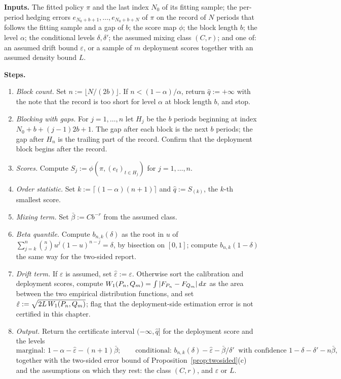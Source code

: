 \documentclass[../../../main.tex]{subfiles}
\begin{document}
\begin{algorithmenv}\label{alg:cert}
\textbf{Inputs.} The fitted policy $\pi$ and the last index $N_0$ of its fitting sample; the per-period hedging errors $e_{N_0+b+1},\dots,e_{N_0+b+N}$ of $\pi$ on the record of $N$ periods that follows the fitting sample and a gap of $b$; the score map $\phi$; the block length $b$; the level $\alpha$; the conditional levels $\delta,\delta'$; the assumed mixing class $(C,r)$; and one of: an assumed drift bound $\varepsilon$, or a sample of $m$ deployment scores together with an assumed density bound $L$.

\textbf{Steps.}
\begin{enumerate}[nosep,label=\arabic*.]
\item \emph{Block count.} Set $n:=\lfloor N/(2b)\rfloor$. If $n<(1-\alpha)/\alpha$, return $\hat q:=+\infty$ with the note that the record is too short for level $\alpha$ at block length $b$, and stop.
\item \emph{Blocking with gaps.} For $j=1,\dots,n$ let $H_j$ be the $b$ periods beginning at index $N_0+b+(j-1)2b+1$. The gap after each block is the next $b$ periods; the gap after $H_n$ is the trailing part of the record. Confirm that the deployment block begins after the record.
\item \emph{Scores.} Compute $S_j:=\phi(\pi,(e_t)_{t\in H_j})$ for $j=1,\dots,n$.
\item \emph{Order statistic.} Set $k:=\lceil(1-\alpha)(n+1)\rceil$ and $\hat q:=S_{(k)}$, the $k$-th smallest score.
\item \emph{Mixing term.} Set $\bar\beta:=Cb^{-r}$ from the assumed class.
\item \emph{Beta quantile.} Compute $b_{n,k}(\delta)$ as the root in $u$ of $\sum_{j=k}^n\binom nju^j(1-u)^{n-j}=\delta$, by bisection on $[0,1]$; compute $b_{n,k}(1-\delta)$ the same way for the two-sided report.
\item \emph{Drift term.} If $\varepsilon$ is assumed, set $\hat\varepsilon:=\varepsilon$. Otherwise sort the calibration and deployment scores, compute $W_1(P_n,Q_m)=\int|F_{P_n}-F_{Q_m}|\,dx$ as the area between the two empirical distribution functions, and set $\hat\varepsilon:=\sqrt{2L\,W_1(P_n,Q_m)}$; flag that the deployment-side estimation error is not certified in this chapter.
\item \emph{Output.} Return the certificate interval $(-\infty,\hat q]$ for the deployment score and the levels
\[
\text{marginal: }1-\alpha-\hat\varepsilon-(n+1)\bar\beta;\qquad
\text{conditional: }b_{n,k}(\delta)-\hat\varepsilon-\bar\beta/\delta'\ \text{ with confidence }1-\delta-\delta'-n\bar\beta,
\]
together with the two-sided error bound of Proposition~\ref{prop:twosided}(c) and the assumptions on which they rest: the class $(C,r)$, and $\varepsilon$ or $L$.
\end{enumerate}
\end{algorithmenv}
\end{document}
